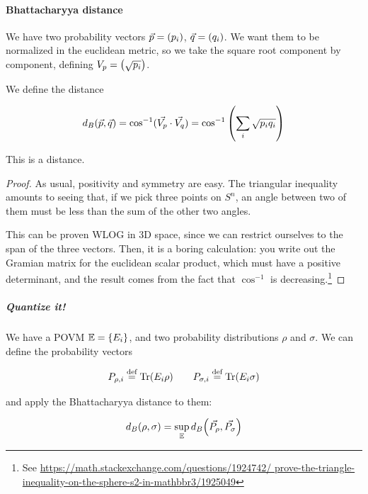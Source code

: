 \documentclass[main.tex]{subfiles}
\begin{document}
\paragraph{Bhattacharyya distance}

We have two probability vectors \(\vec{p} = \qty(p_i)\), \(\vec{q} = \qty(q_i)\).
We want them to be normalized in the euclidean metric, so we take the square root component by component, defining \(V_p = \qty(\sqrt{p_i})\).

We define the distance

\begin{equation}
  d_B (\vec{p}, \vec{q}) = \cos^{-1} (\vec{V_p} \cdot \vec{V_q})
  = \cos^{-1} \qty(\sum_i \sqrt{p_i q_i})
\end{equation}

\begin{claim}
    This is a distance.
\end{claim}

\begin{proof}
    As usual, positivity and symmetry are easy. The triangular inequality amounts to seeing that, if we pick three points on \(S^n\), an angle between two of them must be less than the sum of the other two angles.

    This can be proven WLOG in 3D space, since we can restrict ourselves to the span of the three vectors. Then, it is a boring calculation: you write out the Gramian matrix for the euclidean scalar product, which must have a positive determinant, and the result comes from the fact that \(\cos^{-1}\) is decreasing.\footnote{See \url{https://math.stackexchange.com/questions/1924742/
    prove-the-triangle-inequality-on-the-sphere-s2-in-mathbbr3/1925049}}
\end{proof}

\subparagraph{Quantize it!}

We have a POVM \(\mathbb{E} = \qty{E_i}\), and two probability distributions  \(\rho\) and \(\sigma\).
We can define the probability vectors

\begin{equation}
  P_{\rho, i} \stackrel{\text{def}}{=} \operatorname*{Tr} (E_i \rho)
  \qquad
  P_{\sigma, i} \stackrel{\text{def}}{=} \operatorname*{Tr} (E_i \sigma)
\end{equation}

and apply the Bhattacharyya distance to them:

\begin{equation}
  d_B (\rho, \sigma) = \sup _\mathbb{E} d_B\qty(\vec{P_\rho}, \vec{P_\sigma})
\end{equation}
\end{document}
